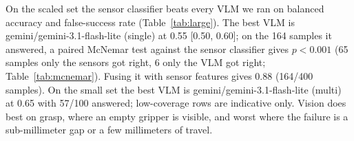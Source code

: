 On the scaled set the sensor classifier beats every VLM we ran on balanced accuracy and false-success rate (Table~\ref{tab:large}). The best VLM is gemini/gemini-3.1-flash-lite (single) at 0.55 [0.50, 0.60]; on the 164 samples it answered, a paired McNemar test against the sensor classifier gives $p < 0.001$ (65 samples only the sensors got right, 6 only the VLM got right; Table~\ref{tab:mcnemar}). Fusing it with sensor features gives 0.88 (164/400 samples). On the small set the best VLM is gemini/gemini-3.1-flash-lite (multi) at 0.65 with 57/100 answered; low-coverage rows are indicative only. Vision does best on grasp, where an empty gripper is visible, and worst where the failure is a sub-millimeter gap or a few millimeters of travel.
